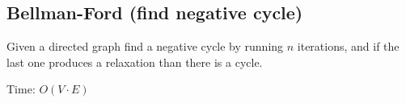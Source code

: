 \subsection{Bellman-Ford (find negative cycle)}

Given a directed graph find a negative cycle by running $n$ iterations, and if the last one produces a relaxation than there is a cycle.

Time: $O(V \cdot E)$

